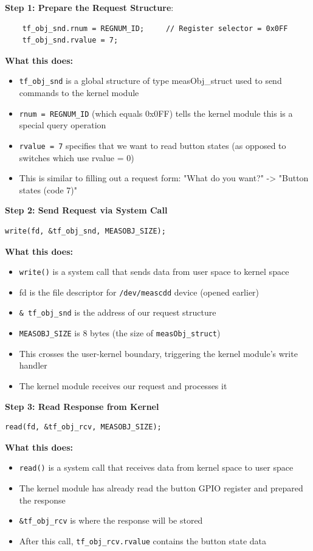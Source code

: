 \textbf{Step 1: Prepare the Request Structure}: 
\begin{verbatim}
	tf_obj_snd.rnum = REGNUM_ID;     // Register selector = 0x0FF
    tf_obj_snd.rvalue = 7;            
\end{verbatim}

\textbf{What this does:} 
\begin{itemize}
\item \texttt{tf\_obj\_snd} is a global structure of type measObj\_struct used to send commands to the kernel module
\item \texttt{rnum = REGNUM\_ID} (which equals 0x0FF) tells the kernel module this is a special query operation
\item \texttt{rvalue = 7} specifies that we want to read button states (as opposed to switches which use rvalue = 0)
\item This is similar to filling out a request form: "What do you want?" -> "Button states (code 7)"
\end{itemize}

\textbf{Step 2: Send Request via System Call}
\begin{verbatim}
write(fd, &tf_obj_snd, MEASOBJ_SIZE);
\end{verbatim}

\textbf{What this does:}
\begin{itemize}
\item \texttt{write()} is a system call that sends data from user space to kernel space
\item fd is the file descriptor for \texttt{/dev/meascdd} device (opened earlier)
\item \texttt{\& tf\_obj\_snd} is the address of our request structure
\item \texttt{MEASOBJ\_SIZE} is 8 bytes (the size of \texttt{measObj\_struct})
\item This crosses the user-kernel boundary, triggering the kernel module's write handler
\item The kernel module receives our request and processes it
\end{itemize}

\textbf{Step 3: Read Response from Kernel}
\begin{verbatim}
read(fd, &tf_obj_rcv, MEASOBJ_SIZE);
\end{verbatim}

\textbf{What this does:}
\begin{itemize}
    \item \texttt{read()} is a system call that receives data from kernel space to user space
    \item The kernel module has already read the button GPIO register and prepared the response
    \item \texttt{\&tf\_obj\_rcv} is where the response will be stored
    \item After this call, \texttt{tf\_obj\_rcv.rvalue} contains the button state data
\end{itemize}


